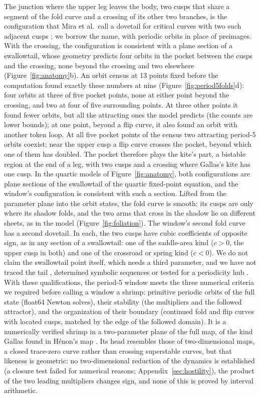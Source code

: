 \documentclass[11pt,letterpaper]{article}
\begin{document}
The junction where the upper leg leaves the body, two cusps that share a segment of the fold curve and a crossing
of its other two branches, is the configuration that Mira et al.\ call a dovetail for critical curves with two such
adjacent cusps
\cite{mira1996chaotic}; we borrow the name, with periodic orbits in place of preimages. With the crossing, the
configuration is consistent with a plane section of a swallowtail, whose geometry predicts four orbits in the pocket
between the cusps and the crossing, none beyond the crossing and two elsewhere (Figure~\ref{fig:anatomy}b). An orbit census at 13 points fixed
before the computation found exactly these numbers at nine (Figure~\ref{fig:period5folds}d): four orbits at three of
five pocket points, none at either point beyond the crossing, and two at four of five surrounding points. At three
other points it found fewer orbits, but all the attracting ones the model predicts (the counts are lower bounds); at
one point, beyond a flip curve, it also found an orbit with another token loop. At all five pocket points of the census
two attracting period-5 orbits coexist; near the upper cusp a flip curve crosses the pocket, beyond which one of them
has doubled. The pocket therefore plays the kite's part, a bistable region at the end of a leg, with two cusps and a
crossing where Gallas's kite has one cusp. In the quartic models of Figure~\ref{fig:anatomy}, both configurations are
plane sections of the swallowtail of the quartic fixed-point equation, and the window's configuration is consistent
with such a section. Lifted from the
parameter plane into the orbit states, the fold curve is smooth: its cusps are only where its shadow folds, and the
two arms that cross in the shadow lie on different sheets, as in the model (Figure~\ref{fig:foliation}). The window's second fold curve has a second dovetail. In each, the
two cusps have cubic coefficients of opposite sign, as in any section of a swallowtail: one of the saddle-area kind
($c>0$, the upper cusp in both) and one of the crossroad or spring kind ($c<0$). We do not claim the swallowtail point
itself, which needs a third parameter, and we have not traced the tail \cite{gallas1994dissecting}, determined
symbolic sequences or tested for a periodicity hub \cite{vitolo2011hubs,jones2012rossler}. With these qualifications,
the period-5 window meets the three numerical criteria we required before calling a window a shrimp: primitive
periodic orbits of the full state (float64 Newton solves), their stability (the multipliers and the followed
attractor), and the organization of their boundary (continued fold and flip curves with located cusps, matched by the
edge of the followed domain). It is a numerically verified shrimp in a two-parameter plane of the full map, of the
kind Gallas found in H\'enon's map \cite{henon1976two,gallas1993structure}. Its head resembles those of
two-dimensional maps, a closed trace-zero curve rather than crossing superstable curves, but that likeness is
geometric: no two-dimensional reduction of the dynamics is established (a closure test failed for numerical reasons;
Appendix~\ref{sec:hostility}), the product of the two leading multipliers changes sign, and none of this is proved by
interval arithmetic.
\end{document}
